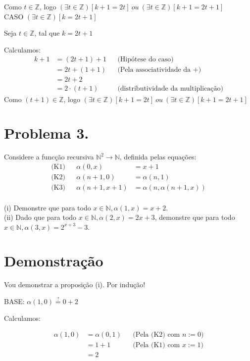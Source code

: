 \documentclass[a4paper]{article}
\def\ints{{\mathbb Z}}
\def\nats{{\mathbb N}}
\def\by#1{&& \text{(#1)}\\}
\def\halmos{ \begin{flushright} \RectangleBold \end{flushright}}
\begin{document}
Como $t\in \ints$, logo $(\exists t \in \ints)[k+1=2t] \ ou \ (\exists t \in \ints)[k+1=2t+1] $\\

CASO  $(\exists t \in \ints)[k=2t+1]$

Seja $t\in \ints$, tal que $k=2t+1$

Calculamos:
\begin{align*}
k+1& = (2t+1)+1     \by {Hipótese do caso} 
& =2t+(1+1)         \by {Pela associatividade da $+$} 
& =2t+ 2         \\
& =2\cdot(t+1)         && \text{(distributividade da multiplicação)} 
\end{align*}
Como $(t+1)\in \ints$, logo $(\exists t \in \ints)[k+1=2t] \ ou \ (\exists t \in \ints)[k+1=2t+1] $
\halmos  \newpage

\section*{Problema 3.}
Considere a funcção recursiva $\nats^2\longrightarrow \nats $, definida pelas equações:\\
  \begin{align*}
  \text{(K1)} && \alpha(0,x) &= x + 1 \\
  \text{(K2)} &&\alpha(n+1, 0) &= \alpha(n,1) \\
  \text{(K3)} && \alpha(n+1, x+1)&= \alpha(n, \alpha(n+1,x))
  \end{align*}\\

(i) Demonstre que para todo $x \in \nats, \alpha(1, x) = x + 2.$ \\
(ii) Dado que para todo $x \in \nats, \alpha(2, x) = 2x + 3$, demonstre que para todo $x \in \nats, \alpha(3, x) = 2^{x+3}-3$.
\section*{Demonstração}

Vou demonstrar a proposição (i).\newline
Por indução!

BASE: $\alpha(1,0)\stackrel{?}{=}0+2 $ 

Calculamos:


\begin{align*}
\alpha(1,0)& = \alpha(0,1)          \by {Pela (K2) com $n:=0$}
& =1+1                              \by {Pela (K1) com $x:=1$}
& = 2                               
\end{align*}
\end{document}
